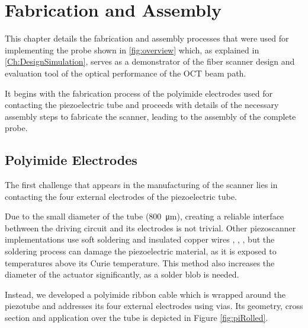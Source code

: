 %
\chapter{Fabrication and Assembly}
\label{Ch:Fab}	

This chapter details the fabrication and assembly processes that were used for implementing the probe shown in \autoref{fig:overview} which, as explained in \autoref{Ch:DesignSimulation}, serves as a demonstrator of the fiber scanner design and evaluation tool of the optical performance of the OCT beam path.

It begins with the fabrication process of the polyimide electrodes used for contacting the piezoelectric tube and proceeds with details of the necessary assembly steps to fabricate the scanner, leading to the assembly of the complete probe.

\section{Polyimide Electrodes}
The first challenge that appears in the manufacturing of the scanner lies in contacting the four external electrodes of the piezoelectric tube. 

Due to the small diameter of the tube (\SI{800}{\micro\meter}), creating a reliable interface bethween the driving circuit and its electrodes is not trivial. Other piezoscanner implementations use soft soldering and insulated copper wires \cite{Lee2010}, \cite{Meinert}, \cite{Huo2010}, but the soldering process can damage the piezoelectric material, as it is exposed to temperatures above its Curie temperature. This method also increases the diameter of the actuator significantly, as a solder blob is needed. %

Instead, we developed a polyimide ribbon cable which is wrapped around the piezotube and addresses its four external electrodes using vias. Its geometry, cross section and application over the tube is depicted in Figure \ref{fig:piRolled}. 

